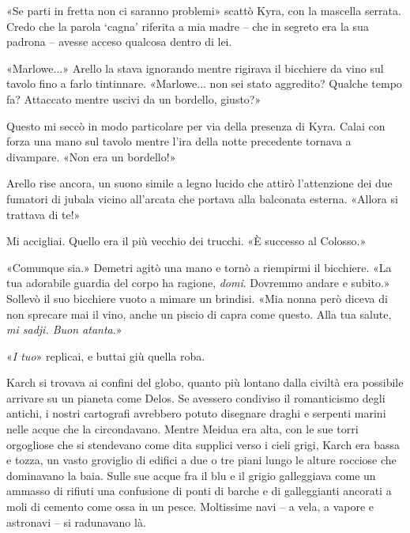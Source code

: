 «Se parti in fretta non ci saranno problemi» scattò Kyra, con la
mascella serrata. Credo che la parola `cagna' riferita a mia madre --
che in segreto era la sua padrona -- avesse acceso qualcosa dentro di
lei.

«Marlowe...» Arello la stava ignorando mentre rigirava il bicchiere da
vino sul tavolo fino a farlo tintinnare. «Marlowe... non sei stato
aggredito? Qualche tempo fa? Attaccato mentre uscivi da un bordello,
giusto?»

Questo mi seccò in modo particolare per via della presenza di Kyra.
Calai con forza una mano sul tavolo mentre l'ira della notte precedente
tornava a divampare. «Non era un bordello!»

Arello rise ancora, un suono simile a legno lucido che attirò
l'attenzione dei due fumatori di jubala vicino all'arcata che portava
alla balconata esterna. «Allora si trattava di te!»

Mi accigliai. Quello era il più vecchio dei trucchi. «È successo al
Colosso.»

«Comunque sia.» Demetri agitò una mano e tornò a riempirmi il bicchiere.
«La tua adorabile guardia del corpo ha ragione, \emph{domi}. Dovremmo
andare e subito.» Sollevò il suo bicchiere vuoto a mimare un brindisi.
«Mia nonna però diceva di non sprecare mai il vino, anche un piscio di
capra come questo. Alla tua salute, \emph{mi sadji. Buon atanta}.»

«\emph{I tuo}» replicai, e buttai giù quella roba.

\begin{figure}
	\centering
	\def\svgwidth{\columnwidth}
	\scalebox{0.2}{}
\end{figure}

Karch si trovava ai confini del globo, quanto più lontano dalla civiltà
era possibile arrivare su un pianeta come Delos. Se avessero condiviso
il romanticismo degli antichi, i nostri cartografi avrebbero potuto
disegnare draghi e serpenti marini nelle acque che la circondavano.
Mentre Meidua era alta, con le sue torri orgogliose che si stendevano
come dita supplici verso i cieli grigi, Karch era bassa e tozza, un
vasto groviglio di edifici a due o tre piani lungo le alture rocciose
che dominavano la baia. Sulle sue acque fra il blu e il grigio
galleggiava come un ammasso di rifiuti una confusione di ponti di barche
e di galleggianti ancorati a moli di cemento come ossa in un pesce.
Moltissime navi -- a vela, a vapore e astronavi -- si radunavano là.

